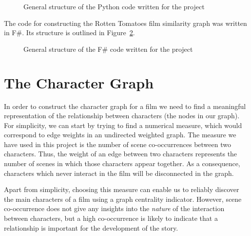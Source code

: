 \documentclass[bsc,frontabs,singlespacing,parskip, twoside]{infthesis}
\begin{document}
\hspace{.1in}
\begin{figure}[ht!]
\caption{General structure of the Python code written for the project}
\label{fig:dirtree}
\end{figure}

The code for constructing the Rotten Tomatoes film similarity graph was written in F\#. Its structure is outlined in Figure~\ref{fig:fsharpdirtree}.

\begin{figure}[th!]
\caption{General structure of the F\# code written for the project}
\label{fig:fsharpdirtree}
\end{figure}

\section{The Character Graph}
In order to construct the character graph for a film we need to find a meaningful representation of the relationship between characters (the nodes in our graph). For simplicity, we can start by trying to find a numerical measure, which would correspond to edge weights in an undirected weighted graph. The measure we have used in this project is the number of scene co-occurrences between two characters. Thus, the weight of an edge between two characters represents the number of scenes in which those characters appear together. As a consequence, characters which never interact in the film will be disconnected in the graph. 

Apart from simplicity, choosing this measure can enable us to reliably discover the main characters of a film using a graph centrality indicator. However, scene co-occurrence does not give any insights into the \textit{nature} of the interaction between characters, but a high co-occurrence is likely to indicate that a relationship is important for the development of the story.
\end{document}
